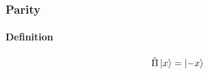 \documentclass[letterpaper,10pt,english]{sphinxmanual}
\begin{document}
\subsubsection{Parity}
\label{QuantumMechanics:id2}

\paragraph{Definition}
\label{QuantumMechanics:definition}\begin{gather}
\begin{split}\hat \Pi \ket{x}= \ket{-x}\end{split}\notag\\\begin{split}\end{split}\notag
\end{gather}
\end{document}
